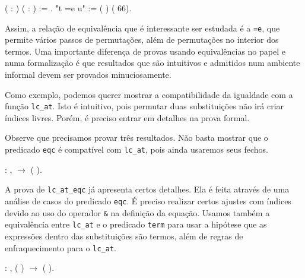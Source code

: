   ( : ) ( : ) :=    .\coqdoceol
{} "t =e u" := (  ) (  66).\coqdoceol
\bigskip

Assim, a relação de equivalência que é interessante ser estudada é a \texttt{=e}, que
permite vários passos de permutações, além de permutações no interior dos
termos. Uma importante diferença de provas usando equivalências no papel e numa
formalização é que resultados que são intuitivos e admitidos num ambiente
informal devem ser provados minuciosamente.

Como exemplo, podemos querer mostrar a compatibilidade da igualdade com a
função \texttt{lc\_at}. Isto é intuitivo, pois permutar duas substituições não
irá criar índices livres. Porém, é preciso entrar em detalhes na prova formal. 

Observe que precisamos provar três resultados. Não basta mostrar que o predicado
\texttt{eqc} é compatível com \texttt{lc\_at}, pois ainda usaremos seus fechos.

\bigskip 
\coqnoindent {}  :
\coqdockw{\ensuremath{\forall}}   ,
 
  \ensuremath{\rightarrow} (
  
  ).\coqdoceol
\bigskip 

A prova de \texttt{lc\_at\_eqc} já apresenta certos detalhes. Ela é feita
através de uma análise de casos do predicado \texttt{eqc}. É preciso realizar
certos ajustes com índices devido ao uso do operador \texttt{\&} na definição da
equação. Usamos também a equivalência entre \texttt{lc\_at} e o
predicado \texttt{term} para usar a hipótese que as expressões dentro das
substituições são termos, além de regras de enfraquecimento para o
\texttt{lc\_at}.

\bigskip 
\coqnoindent {}  :
\coqdockw{\ensuremath{\forall}}   ,
( )  
\ensuremath{\rightarrow} ( 
 
  ).\coqdoceol
\bigskip 

